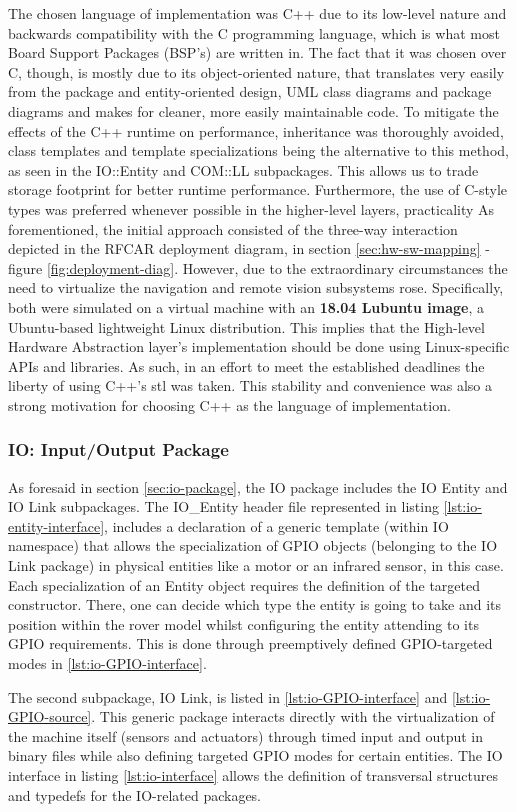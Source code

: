 The chosen language of implementation was C++ due to its low-level nature and backwards compatibility with the C programming language, which is what most Board Support Packages (BSP's) are written in. The fact that it was chosen over C, though, is mostly due to its object-oriented nature, that translates very easily from the package and entity-oriented design, UML class diagrams and package diagrams and makes for cleaner, more easily maintainable code. To mitigate the effects of the C++ runtime on performance, inheritance was thoroughly avoided, class templates and template specializations being the alternative to this method, as seen in the IO::Entity and COM::LL subpackages. This allows us to trade storage footprint for better runtime performance. Furthermore, the use of C-style types was preferred whenever possible in the higher-level layers, practicality
As forementioned, the initial approach consisted of the three-way interaction depicted in the RFCAR deployment diagram, in section \ref{sec:hw-sw-mapping} - figure \ref{fig:deployment-diag}. However, due to the extraordinary circumstances the need to virtualize the navigation and remote vision subsystems rose. Specifically, both were simulated on a virtual machine with an \textbf{18.04 Lubuntu image}, a Ubuntu-based lightweight Linux distribution. This implies that the High-level Hardware Abstraction layer's implementation should be done using Linux-specific APIs and libraries. As such, in an effort to meet the established deadlines the liberty of using C++'s \gls{stl} was taken. This stability and convenience was also a strong motivation for choosing C++ as the language of implementation.
%
\subsubsection{IO: Input/Output Package}
As foresaid in section \ref{sec:io-package}, the IO package includes the IO Entity and IO Link subpackages. The IO\_Entity header file represented in listing \ref{lst:io-entity-interface}, includes a declaration of a generic template (within IO namespace) that allows the specialization of GPIO objects (belonging to the IO Link package) in physical entities like a motor or an infrared sensor, in this case. Each specialization of an Entity object requires the definition of the targeted constructor. There, one can decide which type the entity is going to take and its position within the rover model whilst configuring the entity attending to its GPIO requirements. This is done through preemptively defined GPIO-targeted modes in \ref{lst:io-GPIO-interface}.\par
%
The second subpackage, IO Link, is listed in \ref{lst:io-GPIO-interface} and \ref{lst:io-GPIO-source}. This generic package interacts directly with the virtualization of the machine itself (sensors and actuators) through timed input and output in binary files while also defining targeted GPIO modes for certain entities. The IO interface in listing \ref{lst:io-interface} allows the definition of transversal structures and typedefs for the IO-related packages.
%

%
%
